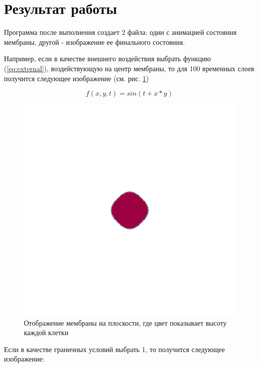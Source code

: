 \newpage

\section*{Результат работы}

Программа после выполнения создает 2 файла: один с анимацией состояния мембраны,
другой - изображение ее финального состояния.

Например, если в качестве внешнего воздействия выбрать функцию
(\ref{eq:external}), воздействующую на центр мембраны, то для 100 временных
слоев получится следующее изображение (см. рис. \ref{fig:image})

\begin{equation}
    f(x, y, t) = sin(t + x * y)
    \label{eq:external}
\end{equation}

\begin{figure}[H]
    \centering
    \includegraphics[width=\linewidth]{images/output.png}
    \caption{Отображение мембраны на плоскости, где цвет показывает высоту каждой клетки}
    \label{fig:image}
\end{figure}

Если в качестве граничных условий выбрать 1, то получится следующее изображение:

